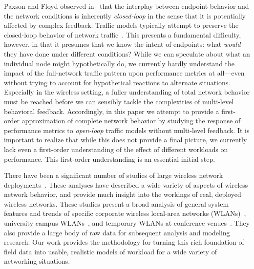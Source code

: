 \documentclass[twocolumn,final]{svjour3}
\newcommand{\caps}[1]{{\small{#1}}}
\begin{document}
Paxson and Floyd observed in~\cite{Paxson95} that the interplay between endpoint behavior and the network conditions is inherently \textit{closed-loop} in the sense that it is potentially affected by complex feedback. Traffic models typically attempt to preserve the closed-loop behavior of network traffic~\cite{Avallone04,Hernandez06:dissertation}. This presents a fundamental difficulty, however, in that it presumes that we know the intent of endpoints: what \textit{would} they have done under different conditions? While we can speculate about what an individual node might hypothetically do, we currently hardly understand the impact of the full-network traffic pattern upon performance metrics at all---even without trying to account for hypothetical reactions to alternate situations. Especially in the wireless setting, a fuller understanding of total network behavior must be reached before we can sensibly tackle the complexities of multi-level behavioral feedback. Accordingly, in this paper we attempt to provide a first-order approximation of complete network behavior by studying the response of performance metrics to \textit{open-loop} traffic models without multi-level feedback. It is important to realize that while this does not provide a final picture, we currently lack even a first-order understanding of the effect of different workloads on performance. This first-order understanding is an essential initial step.

There have been a significant number of studies of large wireless network deployments~\cite{Tang99,Balachandran02,Balazinska03,Kotz02,Henderson04,Schwab04,Chinchilla04,Jardosh05:ewind}. These analyses have described a wide variety of aspects of wireless network behavior, and provide much insight into the workings of real, deployed wireless networks. These studies present a broad analysis of general system features and trends of specific corporate wireless local-area networks (\caps{WLAN}s)~\cite{Tang99,Balazinska03}, university campus \caps{WLAN}s~\cite{Tang00,Kotz02,Chinchilla04,Schwab04,Henderson04,Tuduce05}, and temporary \caps{WLAN}s at conference venues~\cite{Balachandran02,Jardosh05:ewind}. They also provide a large body of raw data for subsequent analysis and modeling research. Our work provides the methodology for turning this rich foundation of field data into usable, realistic models of workload for a wide variety of networking situations.
\end{document}
